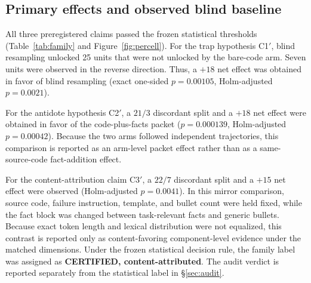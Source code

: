 \documentclass{article}
\numberwithin{equation}{section}  %
\newcommand{\fitwidth}[1]{\resizebox{\ifdim\width>\linewidth \linewidth\else\width\fi}{!}{#1}}
\theoremstyle{definition}
\newcommand{\bten}{b_{10}}
\newcommand{\bzo}{b_{01}}
\newcommand{\Cone}{C1$'$}
\newcommand{\Ctwo}{C2$'$}
\newcommand{\Cthree}{C3$'$}
\begin{document}
\subsection{Primary effects and observed blind baseline}
\label{sec:family}

All three preregistered claims passed the frozen statistical thresholds
(Table~\ref{tab:family} and Figure~\ref{fig:percell}). For the trap hypothesis \Cone{},
blind resampling unlocked 25 units that were not unlocked by the bare-code arm. Seven units
were observed in the reverse direction. Thus, a $+18$ net effect was obtained in favor of
blind resampling (exact one-sided $p=0.00105$, Holm-adjusted $p=0.0021$).

For the antidote hypothesis \Ctwo{}, a $21/3$ discordant split and a $+18$ net effect were
obtained in favor of the code-plus-facts packet
($p=0.000139$, Holm-adjusted $p=0.00042$). Because the two arms followed independent
trajectories, this comparison is reported as an arm-level packet effect rather than as a
same-source-code fact-addition effect.

For the content-attribution claim \Cthree{}, a $22/7$ discordant split and a $+15$ net effect
were observed (Holm-adjusted $p=0.0041$). In this mirror comparison, source code, failure
instruction, template, and bullet count were held fixed, while the fact block was changed
between task-relevant facts and generic bullets. Because exact token length and lexical
distribution were not equalized, this contrast is reported only as content-favoring
component-level evidence under the matched dimensions. Under the frozen statistical decision
rule, the family label was assigned as \textbf{CERTIFIED, content-attributed}. The audit
verdict is reported separately from the statistical label in \S\ref{sec:audit}.

\begin{table}[t]
\caption{Preregistered family on $n=290$ dead units. Pooled exact one-sided McNemar tests were
evaluated within a three-claim Holm family. $\bzo$ denotes units unlocked only by the favored
arm. $\bten$ denotes units unlocked only by the comparison arm. Net effect was computed as
$\bzo-\bten$. The share column reports $\bzo/(\bzo+\bten)$ with the exact Clopper--Pearson
95\% interval. The final column reports the Haldane--Anscombe-smoothed pooled matched-pair
odds ratio.}
\label{tab:family}
\centering\footnotesize\setlength{\tabcolsep}{4pt}
\fitwidth{}
\end{table}
\end{document}
